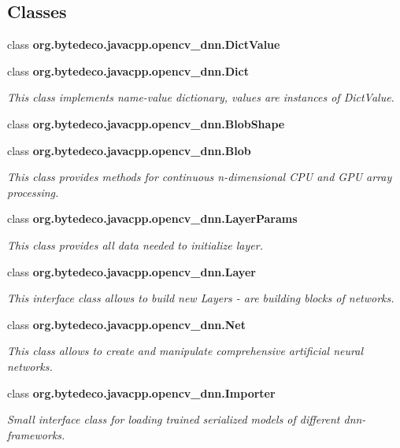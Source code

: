 \subsection*{Classes}
\begin{DoxyCompactItemize}
\item 
class {\bfseries org.\+bytedeco.\+javacpp.\+opencv\+\_\+dnn.\+Dict\+Value}
\item 
class {\bfseries org.\+bytedeco.\+javacpp.\+opencv\+\_\+dnn.\+Dict}
\begin{DoxyCompactList}\small\item\em This class implements name-\/value dictionary, values are instances of Dict\+Value. \end{DoxyCompactList}\item 
class {\bfseries org.\+bytedeco.\+javacpp.\+opencv\+\_\+dnn.\+Blob\+Shape}
\item 
class {\bfseries org.\+bytedeco.\+javacpp.\+opencv\+\_\+dnn.\+Blob}
\begin{DoxyCompactList}\small\item\em This class provides methods for continuous n-\/dimensional C\+PU and G\+PU array processing. \end{DoxyCompactList}\item 
class {\bfseries org.\+bytedeco.\+javacpp.\+opencv\+\_\+dnn.\+Layer\+Params}
\begin{DoxyCompactList}\small\item\em This class provides all data needed to initialize layer. \end{DoxyCompactList}\item 
class {\bfseries org.\+bytedeco.\+javacpp.\+opencv\+\_\+dnn.\+Layer}
\begin{DoxyCompactList}\small\item\em This interface class allows to build new Layers -\/ are building blocks of networks. \end{DoxyCompactList}\item 
class {\bfseries org.\+bytedeco.\+javacpp.\+opencv\+\_\+dnn.\+Net}
\begin{DoxyCompactList}\small\item\em This class allows to create and manipulate comprehensive artificial neural networks. \end{DoxyCompactList}\item 
class {\bfseries org.\+bytedeco.\+javacpp.\+opencv\+\_\+dnn.\+Importer}
\begin{DoxyCompactList}\small\item\em Small interface class for loading trained serialized models of different dnn-\/frameworks. \end{DoxyCompactList}\end{DoxyCompactItemize}
